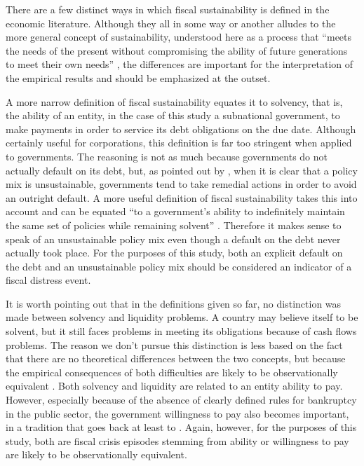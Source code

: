 There are a few distinct ways in which fiscal sustainability is defined in the economic literature. Although they all in some way or another alludes to the more general concept of sustainability, understood here as a process that ``meets the needs of the present without compromising the ability of future generations to meet their own needs'' \citep{un1987}, the differences are important for the interpretation of the empirical results and should be emphasized at the outset.

A more narrow definition of fiscal sustainability equates it to solvency, that is, the ability of an entity, in the case of this study a subnational government, to make payments in order to service its debt obligations on the due date. Although certainly useful for corporations, this definition is far too stringent when applied to governments. The reasoning is not as much because governments do not actually default on its debt, but, as pointed out by \citet{burnside2005}, when it is clear that a policy mix is unsustainable, governments tend to take remedial actions in order to avoid an outright default. A more useful definition of fiscal sustainability takes this into account and can be equated ``to a government’s ability to indefinitely maintain the same set of policies while remaining solvent'' \citep[pg.11]{burnside2005}. Therefore it makes sense to speak of an unsustainable policy mix even though a default on the debt never actually took place. For the purposes of this study, both an explicit default on the debt and an unsustainable policy mix should be considered an indicator of a fiscal distress event. 

It is worth pointing out that in the definitions given so far, no distinction was made between solvency and liquidity problems. A country may believe itself to be solvent, but it still faces problems in meeting its obligations because of cash flows problems. The reason we don't pursue this distinction is less based on the fact that there are no theoretical differences between the two concepts, but because the empirical consequences of both difficulties are likely to be observationally equivalent \citep[pg.89]{chuhan2005}. Both solvency and liquidity are related to an entity ability to pay. However, especially because of the absence of clearly defined rules for bankruptcy in the public sector, the government willingness to pay also becomes important, in a tradition that goes back at least to \citet{eaton1981}. Again, however, for the purposes of this study, both are fiscal crisis episodes stemming from ability or willingness to pay are likely to be observationally equivalent.

